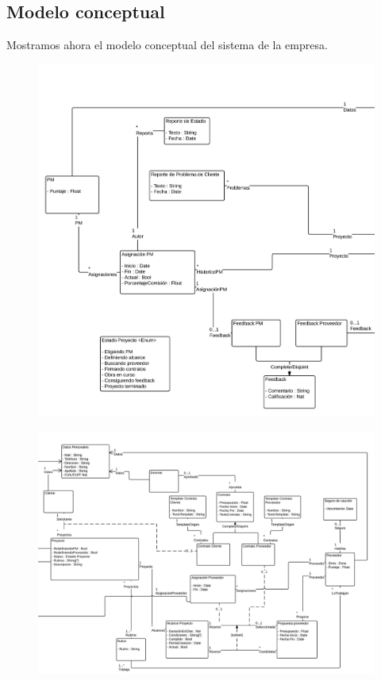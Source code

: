 \subsection{Modelo conceptual}

Mostramos ahora el modelo conceptual del sistema de la empresa. 

\begin{figure}[H]
\includegraphics[width=\linewidth]{diag/nuevos/concept2.png}
\end{figure}
\begin{figure}[H]
\includegraphics[width=\linewidth]{diag/nuevos/concept1.png}
\end{figure}

